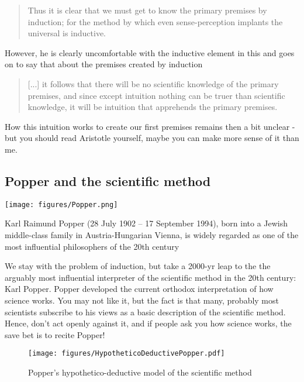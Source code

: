 \documentclass{tufte-book}
\begin{document}
\begin{quote}
    Thus it is clear that we must get to know the primary premises by induction; for the method by which even sense-perception implants the universal is inductive. 
\end{quote}

However, he is clearly uncomfortable with the inductive element in this and goes on to say that about the premises created by induction

\begin{quote}
[...] it follows that there will be no scientific knowledge of the primary premises, and since except intuition nothing can be truer than scientific knowledge, it will be intuition that apprehends the primary premises. 
\end{quote}

How this intuition works to create our first premises remains then a bit unclear - but you should read Aristotle yourself, maybe you can make more sense of it than me. 

\subsection{Popper and the scientific method}

\begin{marginfigure}%
  \texttt{[image: figures/Popper.png]}
  \caption{Karl Raimund Popper (28 July 1902 – 17 September 1994), born into a Jewish middle-class family in Austria-Hungarian Vienna, is widely regarded as one of the most influential philosophers of the 20th century}
  \label{fig: PopperPotrait}
\end{marginfigure}

We stay with the problem of induction, but take a 2000-yr leap to the the arguably most influential interpreter of the scientific method in the 20th century: Karl Popper. Popper developed the current orthodox interpretation of how science works. You may not like it, but the fact is that many, probably most scientists subscribe to his views as a basic description of the scientific method. Hence, don't act openly against it, and if people ask you how science works, the save bet is to recite Popper! 


\begin{figure}[]
\begin{center}
\texttt{[image: figures/HypotheticoDeductivePopper.pdf]}
\caption{Popper's hypothetico-deductive model of the scientific method}
\label{fig: InductiveDeductiveAristotle}
\end{center}
\end{figure}
\end{document}
